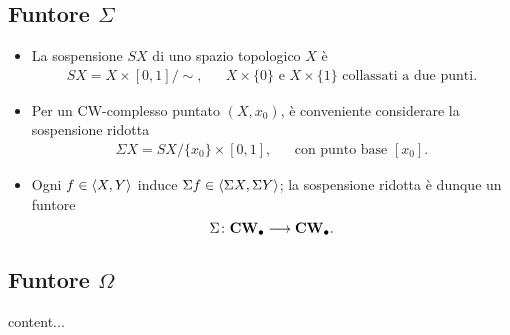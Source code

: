 \subsection*{Funtore \texorpdfstring{$\Sigma$}{Sigma}}
\begin{frame*}
\begin{itemize}
\item La sospensione $SX$ di uno spazio topologico $X$ è
\begin{align*}
SX=X\times[0,1]/\sim,&&\text{$X\times\{0\}$ e $X\times\{1\}$ collassati a due punti.}
\end{align*}
\item Per un CW-complesso puntato $(X,x_0)$, è conveniente considerare la sospensione ridotta
\begin{align*}
\Sigma X=SX/\{x_0\}\times[0,1],&&\text{con punto base $[x_0]$.}
\end{align*}
\item Ogni $f\in\left\langle X,Y\right\rangle$ induce $\Sigma f\in\left\langle \Sigma X,\Sigma Y\right\rangle$; la sospensione ridotta è dunque un funtore
\[
\map{\Sigma}{\CW0}{\CW0}.
\]
\end{itemize}
\end{frame*}

\subsection*{Funtore \texorpdfstring{$\Omega$}{Omega}}
\begin{frame*}
content...
\end{frame*}